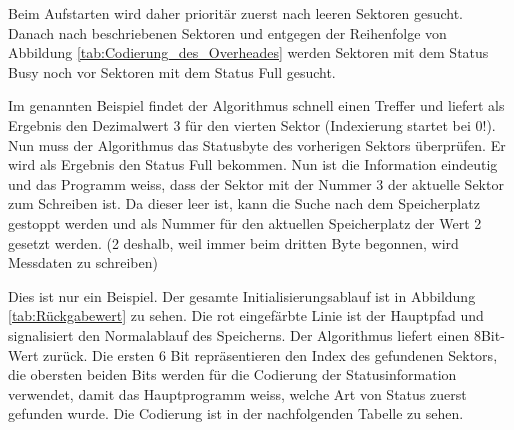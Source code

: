 Beim Aufstarten wird daher prioritär zuerst nach leeren Sektoren gesucht. Danach nach beschriebenen Sektoren und entgegen der Reihenfolge von Abbildung \ref{tab:Codierung_des_Overheades} werden Sektoren mit dem Status \glqq Busy\grqq{}  noch vor Sektoren mit dem Status \glqq Full\grqq{}  gesucht.

Im genannten Beispiel findet der Algorithmus schnell einen Treffer und liefert als Ergebnis den Dezimalwert 3 für den vierten Sektor (Indexierung startet bei 0!). Nun muss der Algorithmus das Statusbyte des vorherigen Sektors überprüfen. Er wird als Ergebnis den Status \glqq Full\grqq{} bekommen. Nun ist die Information eindeutig und das Programm weiss, dass der Sektor mit der Nummer 3 der aktuelle Sektor zum Schreiben ist. Da dieser leer ist, kann die Suche nach dem Speicherplatz gestoppt werden und als Nummer für den aktuellen Speicherplatz der Wert 2 gesetzt werden. (2 deshalb, weil immer beim dritten Byte begonnen, wird Messdaten zu schreiben)

Dies ist nur ein Beispiel. Der gesamte Initialisierungsablauf ist in Abbildung \ref{tab:Rückgabewert} zu sehen. Die rot eingefärbte Linie ist der Hauptpfad und signalisiert den Normalablauf des Speicherns. Der Algorithmus liefert einen 8Bit-Wert zurück. Die ersten 6 Bit repräsentieren den Index des gefundenen Sektors, die obersten beiden Bits werden für die Codierung der Statusinformation verwendet, damit das Hauptprogramm weiss, welche Art von Status zuerst gefunden wurde. Die Codierung ist in der nachfolgenden Tabelle zu sehen.


